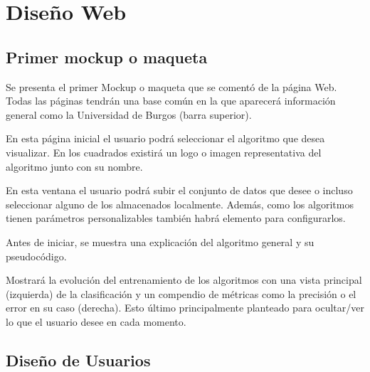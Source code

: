 \section{Diseño Web}

\subsection{Primer mockup o maqueta}
Se presenta el primer Mockup o maqueta que se comentó de la página Web. Todas
las páginas tendrán una base común en la que aparecerá información general como
la Universidad de Burgos (barra superior).


En esta página inicial el usuario podrá seleccionar el algoritmo que desea
visualizar. En los cuadrados existirá un logo o imagen representativa del
algoritmo junto con su nombre.


En esta ventana el usuario podrá subir el conjunto de datos que desee o incluso
seleccionar alguno de los almacenados localmente. Además, como los algoritmos
tienen parámetros personalizables también habrá elemento para configurarlos.

Antes de iniciar, se muestra una explicación del algoritmo general y su
pseudocódigo.



Mostrará la evolución del entrenamiento de los algoritmos con una vista
principal (izquierda) de la clasificación y un compendio de métricas como la
precisión o el error en su caso (derecha). Esto último principalmente planteado
para ocultar/ver lo que el usuario desee en cada momento.

\subsection{Diseño de Usuarios}

